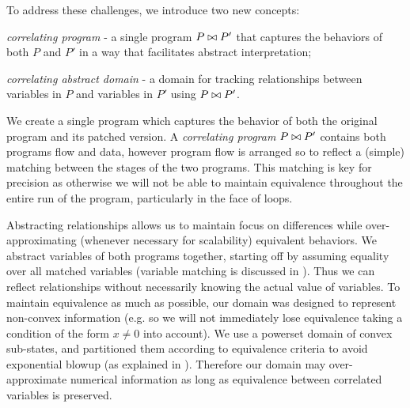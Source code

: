To address these challenges, we introduce two new concepts:
\begin{inparaenum}[(i)]
\item \emph{correlating program} - a single program $P \bowtie P'$ that captures the behaviors of both $P$ and $P'$ in a way that facilitates abstract interpretation;
\item \emph{correlating abstract domain} - a domain for tracking relationships between variables in $P$ and variables in $P'$ using $P \bowtie P'$.
\end{inparaenum}

We create a single program which captures the behavior of both the original program and its patched version. A \emph{correlating program} $P \bowtie P'$ contains both programs flow and data, however program flow is arranged so to reflect a (simple) matching between the stages of the two programs. This matching is key for precision as otherwise we will not be able to maintain equivalence throughout the entire run of the program, particularly in the face of loops.

Abstracting relationships allows us to maintain focus on differences while over-approximating (whenever necessary for scalability) equivalent behaviors. We abstract variables of both programs together, starting off by assuming equality over all matched variables (variable matching is discussed in \secref{}). Thus we can
reflect relationships without necessarily knowing the actual value of
variables. To maintain equivalence as much as possible, our domain was designed to represent non-convex information (e.g. so we will not immediately lose equivalence taking a condition of the form $x \neq 0$ into account). We use a powerset domain of convex sub-states, and partitioned them according to equivalence criteria to avoid exponential blowup (as explained in \secref{}). Therefore our domain may over-approximate numerical information as long as equivalence between correlated variables is preserved.

